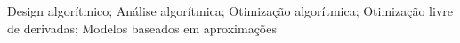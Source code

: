 \noindent Design algorítmico; Análise algorítmica; Otimização algorítmica; Otimização livre de derivadas; Modelos baseados em aproximações


